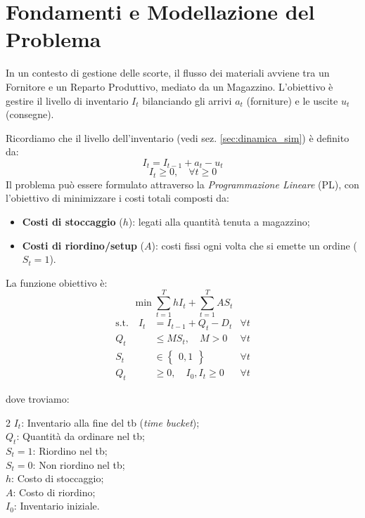 %
%
\section{Fondamenti e Modellazione del Problema}
In un contesto di gestione delle scorte, il flusso dei materiali avviene tra un Fornitore e un Reparto Produttivo, mediato da un Magazzino. L'obiettivo è gestire il livello di inventario $I_t$ bilanciando gli arrivi $a_t$ (forniture) e le uscite $u_t$ (consegne).

Ricordiamo che il livello dell'inventario (vedi sez. \ref{sec:dinamica_sim}) è definito da:
\[
    I_{t} = I_{t-1} + a_{t} - u_{t}
\]
\[
    I_{t}\geq 0, \quad \forall t \geq 0
\]
Il problema può essere formulato attraverso la \emph{Programmazione Lineare} (PL), con l'obiettivo di minimizzare i costi totali composti da:
\begin{itemize}
    \item \textbf{Costi di stoccaggio} ($h$): legati alla quantità tenuta a magazzino;
    \item \textbf{Costi di riordino/setup} ($A$): costi fissi ogni volta che si emette un ordine ($S_t=1$).
\end{itemize}
La funzione obiettivo è:
\[
    \min \sum_{t=1}^{T}hI_{t}+\sum_{t=1}^{T}AS_{t}
\]
\begin{align*}
    \text{s.t.} \quad I_{t} & = I_{t-1}+Q_{t}-D_{t}                 & \forall t \\
    Q_{t}                   & \leq MS_{t}, \quad M > 0              & \forall t \\
    S_{t}                   & \in \begin{Bmatrix} 0,1 \end{Bmatrix} & \forall t \\
    Q_{t}                   & \geq 0, \quad I_{0},I_{t} \geq 0      & \forall t
\end{align*}

dove troviamo:
\begin{multicols}{2}
    $ I_{t} $: Inventario alla fine del tb (\emph{time bucket}); \\
    $ Q_{t} $: Quantità da ordinare nel tb; \\
    $ S_{t} = 1$: Riordino nel tb; \\
    $ S_{t} = 0 $: Non riordino nel tb; \\
    $ h $: Costo di stoccaggio; \\
    $ A $: Costo di riordino; \\
    $ I_{0} $: Inventario iniziale.
\end{multicols}

